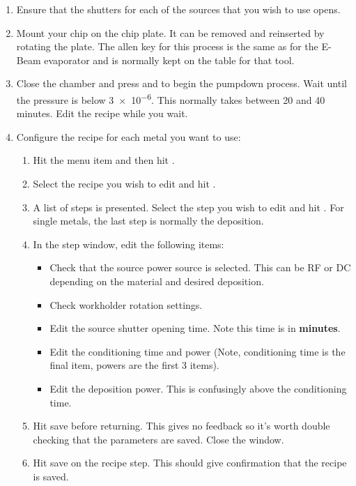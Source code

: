 \begin{enumerate}
\begin{enumerate} 
  \item Close the shutter by pressing the  button again.
\end{enumerate}
\item Ensure that the shutters for each of the sources that you wish to use opens.
\item Mount your chip on the chip plate. It can be removed and reinserted by rotating the plate. The allen key for this process is the same as for the E-Beam evaporator
      and is normally kept on the table for that tool.
\item Close the chamber and press  and  to begin the pumpdown process. Wait until the pressure is below \SI{3e-6}{\torr}. This normally takes between 20 and 40 minutes.
      Edit the recipe while you wait.
\item Configure the recipe for each metal you want to use:
\begin{enumerate}  %
  \item Hit the  menu item and then hit .
  \item Select the recipe you wish to edit and hit .
  \item A list of steps is presented. Select the step you wish to edit and hit . For single metals, the last step is normally the deposition.
  \item In the step window, edit the following items:
  \begin{itemize} [noitemsep, nolistsep]
    \item Check that the source power source is selected. This can be RF or DC depending on the material and desired deposition.
    \item Check workholder rotation settings.
    \item Edit the source shutter opening time. Note this time is in \textbf{minutes}.
    \item Edit the conditioning time and power (Note, conditioning time is the final item, powers are the first 3 items).
    \item Edit the deposition power. This is confusingly above the conditioning time.
  \end{itemize}
  \item Hit save before returning. This gives no feedback so it's worth double checking that the parameters are saved. Close the window.
  \item Hit save on the recipe step. This should give confirmation that the recipe is saved.

\end{enumerate}
\end{enumerate}
